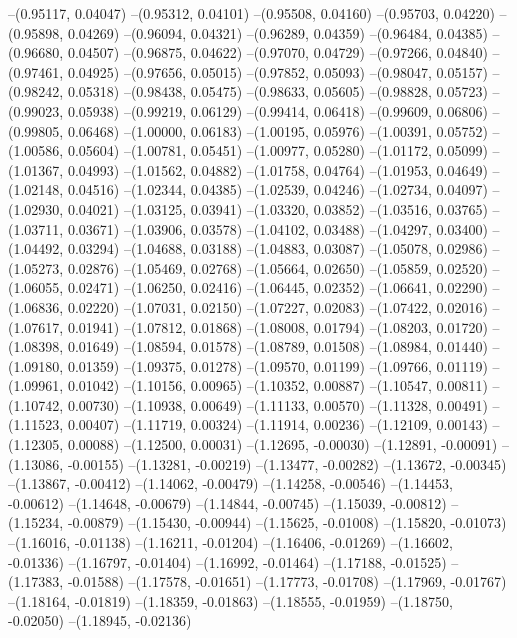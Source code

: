 --(0.95117, 0.04047)
--(0.95312, 0.04101)
--(0.95508, 0.04160)
--(0.95703, 0.04220)
--(0.95898, 0.04269)
--(0.96094, 0.04321)
--(0.96289, 0.04359)
--(0.96484, 0.04385)
--(0.96680, 0.04507)
--(0.96875, 0.04622)
--(0.97070, 0.04729)
--(0.97266, 0.04840)
--(0.97461, 0.04925)
--(0.97656, 0.05015)
--(0.97852, 0.05093)
--(0.98047, 0.05157)
--(0.98242, 0.05318)
--(0.98438, 0.05475)
--(0.98633, 0.05605)
--(0.98828, 0.05723)
--(0.99023, 0.05938)
--(0.99219, 0.06129)
--(0.99414, 0.06418)
--(0.99609, 0.06806)
--(0.99805, 0.06468)
--(1.00000, 0.06183)
--(1.00195, 0.05976)
--(1.00391, 0.05752)
--(1.00586, 0.05604)
--(1.00781, 0.05451)
--(1.00977, 0.05280)
--(1.01172, 0.05099)
--(1.01367, 0.04993)
--(1.01562, 0.04882)
--(1.01758, 0.04764)
--(1.01953, 0.04649)
--(1.02148, 0.04516)
--(1.02344, 0.04385)
--(1.02539, 0.04246)
--(1.02734, 0.04097)
--(1.02930, 0.04021)
--(1.03125, 0.03941)
--(1.03320, 0.03852)
--(1.03516, 0.03765)
--(1.03711, 0.03671)
--(1.03906, 0.03578)
--(1.04102, 0.03488)
--(1.04297, 0.03400)
--(1.04492, 0.03294)
--(1.04688, 0.03188)
--(1.04883, 0.03087)
--(1.05078, 0.02986)
--(1.05273, 0.02876)
--(1.05469, 0.02768)
--(1.05664, 0.02650)
--(1.05859, 0.02520)
--(1.06055, 0.02471)
--(1.06250, 0.02416)
--(1.06445, 0.02352)
--(1.06641, 0.02290)
--(1.06836, 0.02220)
--(1.07031, 0.02150)
--(1.07227, 0.02083)
--(1.07422, 0.02016)
--(1.07617, 0.01941)
--(1.07812, 0.01868)
--(1.08008, 0.01794)
--(1.08203, 0.01720)
--(1.08398, 0.01649)
--(1.08594, 0.01578)
--(1.08789, 0.01508)
--(1.08984, 0.01440)
--(1.09180, 0.01359)
--(1.09375, 0.01278)
--(1.09570, 0.01199)
--(1.09766, 0.01119)
--(1.09961, 0.01042)
--(1.10156, 0.00965)
--(1.10352, 0.00887)
--(1.10547, 0.00811)
--(1.10742, 0.00730)
--(1.10938, 0.00649)
--(1.11133, 0.00570)
--(1.11328, 0.00491)
--(1.11523, 0.00407)
--(1.11719, 0.00324)
--(1.11914, 0.00236)
--(1.12109, 0.00143)
--(1.12305, 0.00088)
--(1.12500, 0.00031)
--(1.12695, -0.00030)
--(1.12891, -0.00091)
--(1.13086, -0.00155)
--(1.13281, -0.00219)
--(1.13477, -0.00282)
--(1.13672, -0.00345)
--(1.13867, -0.00412)
--(1.14062, -0.00479)
--(1.14258, -0.00546)
--(1.14453, -0.00612)
--(1.14648, -0.00679)
--(1.14844, -0.00745)
--(1.15039, -0.00812)
--(1.15234, -0.00879)
--(1.15430, -0.00944)
--(1.15625, -0.01008)
--(1.15820, -0.01073)
--(1.16016, -0.01138)
--(1.16211, -0.01204)
--(1.16406, -0.01269)
--(1.16602, -0.01336)
--(1.16797, -0.01404)
--(1.16992, -0.01464)
--(1.17188, -0.01525)
--(1.17383, -0.01588)
--(1.17578, -0.01651)
--(1.17773, -0.01708)
--(1.17969, -0.01767)
--(1.18164, -0.01819)
--(1.18359, -0.01863)
--(1.18555, -0.01959)
--(1.18750, -0.02050)
--(1.18945, -0.02136)
